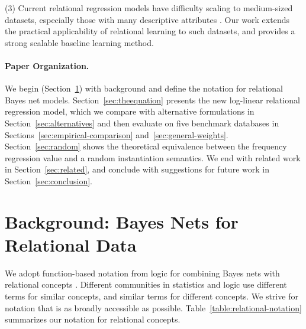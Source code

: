 \documentclass[twoside,11pt]{article}
\newcommand{\strongpoint}[1]{\paragraph{#1.}}
\begin{document}
(3) Current relational regression models have difficulty scaling to medium-sized datasets, especially those with many descriptive attributes \cite{Khot2011,Schulte2011,Natarajan2012}. Our work extends the practical applicability of relational learning to such datasets, and provides a strong scalable baseline learning method.

\strongpoint{Paper Organization}
We begin (Section~\ref{sec:background}) with background and define the notation for relational Bayes net models.
Section~\ref{sec:theequation} presents the new log-linear relational regression model, which we compare
with alternative formulations in Section~\ref{sec:alternatives} and then evaluate
on five benchmark databases in Sections~\ref{sec:empirical-comparison} and~\ref{sec:general-weights}.
Section~\ref{sec:random}  shows the theoretical equivalence between the frequency regression value and a random instantiation semantics.
We end with related work in Section~\ref{sec:related}, and conclude with suggestions for future work in Section~\ref{sec:conclusion}.

 
\section{Background: Bayes Nets for Relational Data} \label{sec:background} We adopt function-based notation from logic for combining Bayes nets with relational concepts \cite{Russell2010,Poole2003,Getoor2006,Chiang2012}. Different communities in statistics and logic use different terms for similar concepts, and similar terms for different concepts. We strive for notation that is as broadly accessible as possible. Table~\ref{table:relational-notation} summarizes our notation for relational concepts. %
\end{document}
